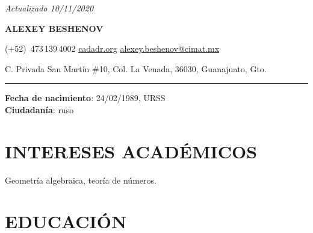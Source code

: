 \documentclass{article}
\begin{document}
{\flushright\noindent\emph{Actualizado 10/11/2020}

}

\begin{center}
{\LARGE\sffamily\bf ALEXEY BESHENOV}

\vspace{0.5em}

\faPhoneSquare{} (+52)~473\,139\,4002 \quad
\faGlobe{} \href{https://cadadr.org/}{cadadr.org} \quad
\faEnvelope{} \href{mailto:alexey.beshenov@cimat.mx}{alexey.beshenov@cimat.mx} \\

\vspace{0.5em}

C. Privada San Martín \#10, Col. La Venada, 36030, Guanajuato, Gto.

\vspace{1em}

\rule{14cm}{1pt}
\end{center}

\vspace{1em}

\noindent \textbf{Fecha de nacimiento}: 24/02/1989, URSS \\
\textbf{Ciudadanía}: ruso

{\color{RoyalBlue}\section*{INTERESES ACADÉMICOS}}

Geometría algebraica, teoría de números.

\vspace{1em}

{\color{RoyalBlue}\section*{EDUCACIÓN}}
\end{document}

